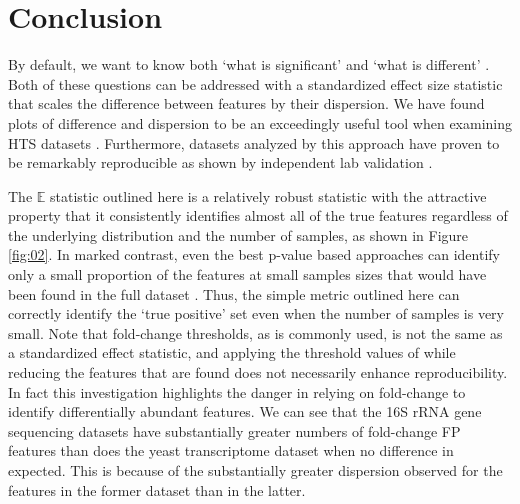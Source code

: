 \documentclass[fleqn,10pt,lineno]{wlpeerj}
\begin{document}
\section*{Conclusion}

By default, we want to know both `what is significant' and `what is different' \citep{Cui:2003aa}.  Both of these questions can be addressed with a standardized effect size statistic that scales the difference between features by their dispersion. We have found plots of difference and dispersion to be an exceedingly useful tool when examining HTS datasets \citep{gloor:effect}. Furthermore, datasets analyzed by this approach have proven to be remarkably reproducible as shown by independent lab validation \citep{macklaim:2013, nelson:2015vaginal}. 

The $\mathbb{E}$ statistic outlined here is a relatively robust statistic with the attractive property that it consistently  identifies almost all of the true features regardless of the underlying distribution  and the number of samples, as shown in Figure \ref{fig:02}. In marked contrast, even the best p-value based  approaches can identify only a small proportion of the features at small samples sizes that would have been found in the full dataset \citep{Schurch:2016aa}. Thus, the simple metric outlined here  can correctly identify the `true positive' set even when the number of samples is very small. Note that fold-change thresholds, as is commonly used, is not the same as a standardized effect statistic, and applying the threshold values of \citep{Schurch:2016aa} while reducing the features that are found does not necessarily enhance reproducibility. In fact this investigation highlights the danger in relying on fold-change to identify differentially abundant features. We can see that the 16S rRNA gene sequencing datasets have substantially greater numbers of fold-change FP features than does the yeast transcriptome dataset when no difference in expected. This is  because of the substantially greater dispersion observed for the features in the former dataset than in the latter.
\end{document}
